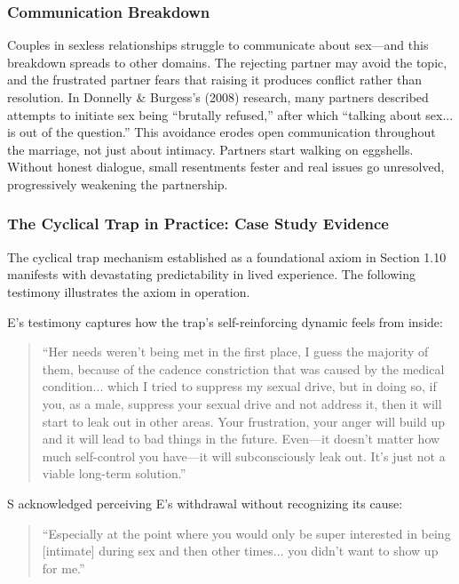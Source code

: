 \documentclass[12pt, letterpaper]{article}
\begin{document}
\subsubsection{Communication Breakdown}

Couples in sexless relationships struggle to communicate about sex---and this breakdown spreads to other domains. The rejecting partner may avoid the topic, and the frustrated partner fears that raising it produces conflict rather than resolution. In Donnelly \& Burgess's (2008) research, many partners described attempts to initiate sex being ``brutally refused,'' after which ``talking about sex... is out of the question.'' This avoidance erodes open communication throughout the marriage, not just about intimacy. Partners start walking on eggshells. Without honest dialogue, small resentments fester and real issues go unresolved, progressively weakening the partnership.

\subsubsection{The Cyclical Trap in Practice: Case Study Evidence}

The cyclical trap mechanism established as a foundational axiom in Section 1.10 manifests with devastating predictability in lived experience. The following testimony illustrates the axiom in operation.

E's testimony captures how the trap's self-reinforcing dynamic feels from inside:

\begin{quote}
``Her needs weren't being met in the first place, I guess the majority of them, because of the cadence constriction that was caused by the medical condition... which I tried to suppress my sexual drive, but in doing so, if you, as a male, suppress your sexual drive and not address it, then it will start to leak out in other areas. Your frustration, your anger will build up and it will lead to bad things in the future. Even---it doesn't matter how much self-control you have---it will subconsciously leak out. It's just not a viable long-term solution.''
\end{quote}

S acknowledged perceiving E's withdrawal without recognizing its cause:

\begin{quote}
``Especially at the point where you would only be super interested in being [intimate] during sex and then other times... you didn't want to show up for me.''
\end{quote}
\end{document}
